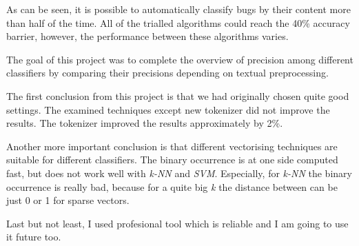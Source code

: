  
As can be seen, it is possible to automatically classify bugs by their content more than half of the time. All of the trialled algorithms could reach the 40\% accuracy barrier, however, the performance between these algorithms varies. 

The goal of this project was to complete the overview of precision among different classifiers by comparing their precisions depending on textual preprocessing.

The first conclusion from this project is that we had originally chosen quite good settings. 
The examined techniques except new tokenizer did not improve the results. The tokenizer improved the results approximately by 2\%.

Another more important conclusion is that different vectorising 
techniques are suitable for different classifiers.
The binary occurrence is at one side computed fast, but does not work well with {\it k-NN} and {\it SVM}. Especially, for {\it k-NN} the binary occurrence is really bad, because for a quite big {\it k} the distance between can be just 0 or 1 for sparse vectors.   

Last but not least, I used profesional tool which is reliable
and I am going to use it future too.
